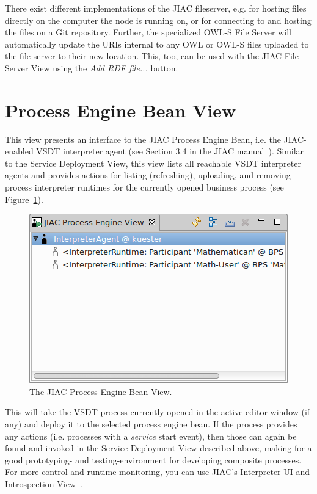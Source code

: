 There exist different implementations of the JIAC fileserver, e.g. for hosting files
directly on the computer the node is running on, or for connecting to and hosting
the files on a Git repository. Further, the specialized OWL-S File Server will
automatically update the URIs internal to any OWL or OWL-S files uploaded to the
file server to their new location. This, too, can be used with the JIAC File
Server View using the \emph{Add RDF file...} button.



\section{Process Engine Bean View}

This view presents an interface to the JIAC Process Engine Bean, i.e. the JIAC-enabled
VSDT interpreter agent (see Section 3.4 in the JIAC manual~\cite{jiacManual}). Similar
to the Service Deployment View, this view lists all reachable VSDT interpreter agents
and provides actions for listing (refreshing), uploading, and removing process interpreter
runtimes for the currently opened business process (see Figure~\ref{fig:processengineView}).

\begin{figure}[ht]
	\centering
	\includegraphics[width=.45\textwidth]{figures/features/processengineview.png}
	\caption{The JIAC Process Engine Bean View.}
	\label{fig:processengineView}
\end{figure}

This will take the VSDT process currently opened in the active editor window (if
any) and deploy it to the selected process engine bean. If the process provides
any actions (i.e. processes with a \emph{service} start event), then those can
again be found and invoked in the Service Deployment View described above, making
for a good prototyping- and testing-environment for developing composite processes.
For more control and runtime monitoring, you can use JIAC's Interpreter UI and
Introspection View~\cite[Sections 3.4 and 3.5]{jiacManual}.
